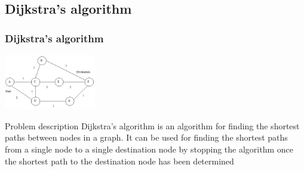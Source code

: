 \subsection{Dijkstra's algorithm}
\begin{frame}[containsverbatim]
\frametitle{Dijkstra's algorithm}
\begin{center}
\includegraphics[width=4.0cm]{Day2/images/dijkstras.png}
\end{center}
\begin{block}{Problem description}
Dijkstra's algorithm is an algorithm for finding the shortest paths between nodes in a graph. It can be used for finding the shortest paths from a single node to a single destination node by stopping the algorithm once the shortest path to the destination node has been determined
\end{block}
\end{frame}





